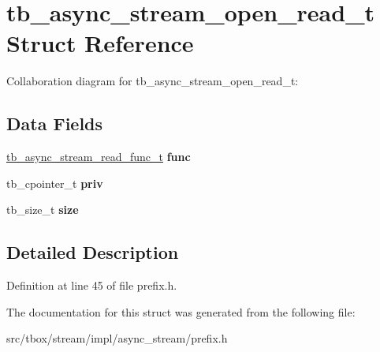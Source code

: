 \hypertarget{structtb__async__stream__open__read__t}{\section{tb\-\_\-async\-\_\-stream\-\_\-open\-\_\-read\-\_\-t Struct Reference}
\label{structtb__async__stream__open__read__t}
}


Collaboration diagram for tb\-\_\-async\-\_\-stream\-\_\-open\-\_\-read\-\_\-t\-:
\subsection*{Data Fields}
\begin{DoxyCompactItemize}
\item 
\hypertarget{structtb__async__stream__open__read__t_ad4c33052fb2b724dc77cac6d1121983c}{\hyperlink{async__stream_8h_aca0105f67fde8666e6e0f9b907136634}{tb\-\_\-async\-\_\-stream\-\_\-read\-\_\-func\-\_\-t} {\bfseries func}}\label{structtb__async__stream__open__read__t_ad4c33052fb2b724dc77cac6d1121983c}

\item 
\hypertarget{structtb__async__stream__open__read__t_a2c75e7843be9c6103791a24f0d2075d4}{tb\-\_\-cpointer\-\_\-t {\bfseries priv}}\label{structtb__async__stream__open__read__t_a2c75e7843be9c6103791a24f0d2075d4}

\item 
\hypertarget{structtb__async__stream__open__read__t_a5bcf16ab04d831bf23b5c3dee8d93f28}{tb\-\_\-size\-\_\-t {\bfseries size}}\label{structtb__async__stream__open__read__t_a5bcf16ab04d831bf23b5c3dee8d93f28}

\end{DoxyCompactItemize}


\subsection{Detailed Description}


Definition at line 45 of file prefix.\-h.



The documentation for this struct was generated from the following file\-:\begin{DoxyCompactItemize}
\item 
src/tbox/stream/impl/async\-\_\-stream/prefix.\-h\end{DoxyCompactItemize}
